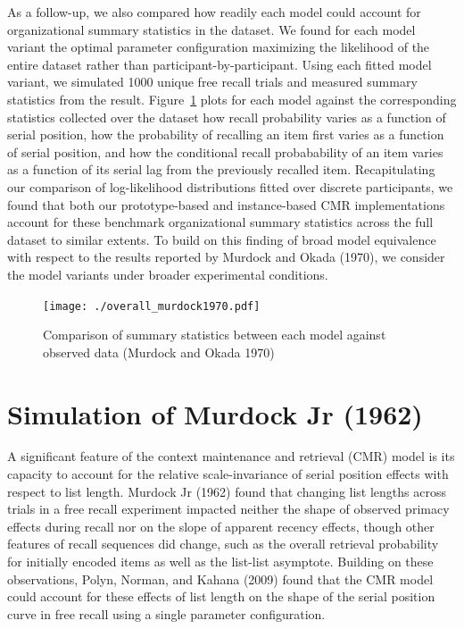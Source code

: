 \documentclass[
  letterpaper,
  DIV=11]{article}
\begin{document}
As a follow-up, we also compared how readily each model could account
for organizational summary statistics in the dataset. We found for each
model variant the optimal parameter configuration maximizing the
likelihood of the entire dataset rather than participant-by-participant.
Using each fitted model variant, we simulated 1000 unique free recall
trials and measured summary statistics from the result.
Figure~\ref{fig-murdokasummary} plots for each model against the
corresponding statistics collected over the dataset how recall
probability varies as a function of serial position, how the probability
of recalling an item first varies as a function of serial position, and
how the conditional recall probabability of an item varies as a function
of its serial lag from the previously recalled item. Recapitulating our
comparison of log-likelihood distributions fitted over discrete
participants, we found that both our prototype-based and instance-based
CMR implementations account for these benchmark organizational summary
statistics across the full dataset to similar extents. To build on this
finding of broad model equivalence with respect to the results reported
by Murdock and Okada (1970), we consider the model variants under
broader experimental conditions.

\begin{figure}

{\centering \texttt{[image: ./overall\_murdock1970.pdf]}

}

\caption{\label{fig-murdokasummary}Comparison of summary statistics
between each model against observed data (Murdock and Okada 1970)}

\end{figure}

\hypertarget{simulation-of-murdock-jr-1962}{%
\section{Simulation of Murdock Jr
(1962)}\label{simulation-of-murdock-jr-1962}}

A significant feature of the context maintenance and retrieval (CMR)
model is its capacity to account for the relative scale-invariance of
serial position effects with respect to list length. Murdock Jr (1962)
found that changing list lengths across trials in a free recall
experiment impacted neither the shape of observed primacy effects during
recall nor on the slope of apparent recency effects, though other
features of recall sequences did change, such as the overall retrieval
probability for initially encoded items as well as the list-list
asymptote. Building on these observations, Polyn, Norman, and Kahana
(2009) found that the CMR model could account for these effects of list
length on the shape of the serial position curve in free recall using a
single parameter configuration.
\end{document}
